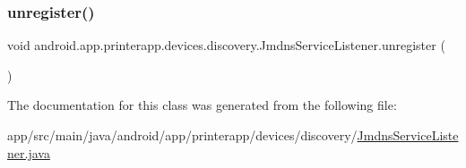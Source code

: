 \mbox{\label{classandroid_1_1app_1_1printerapp_1_1devices_1_1discovery_1_1_jmdns_service_listener_a01173a6f2835409e9fec19de5b20bd1a}} 
\subsubsection{\texorpdfstring{unregister()}{unregister()}}
{\footnotesize\ttfamily void android.\+app.\+printerapp.\+devices.\+discovery.\+Jmdns\+Service\+Listener.\+unregister (\begin{DoxyParamCaption}{ }\end{DoxyParamCaption})}



The documentation for this class was generated from the following file\+:\begin{DoxyCompactItemize}
\item 
app/src/main/java/android/app/printerapp/devices/discovery/\hyperlink{_jmdns_service_listener_8java}{Jmdns\+Service\+Listener.\+java}\end{DoxyCompactItemize}
